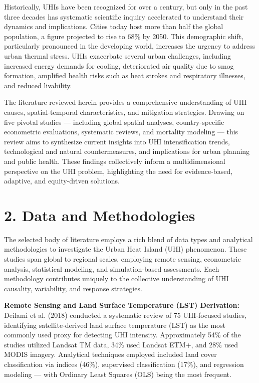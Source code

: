 \documentclass[draft]{agujournal}
\begin{document}
Historically, UHIs have been recognized for over a century, but only in the past three decades has systematic scientific inquiry accelerated to understand their dynamics and implications. Cities today host more than half the global population, a figure projected to rise to 68\% by 2050. This demographic shift, particularly pronounced in the developing world, increases the urgency to address urban thermal stress. UHIs exacerbate several urban challenges, including increased energy demands for cooling, deteriorated air quality due to smog formation, amplified health risks such as heat strokes and respiratory illnesses, and reduced livability.

The literature reviewed herein provides a comprehensive understanding of UHI causes, spatial-temporal characteristics, and mitigation strategies. Drawing on five pivotal studies — including global spatial analyses, country-specific econometric evaluations, systematic reviews, and mortality modeling — this review aims to synthesize current insights into UHI intensification trends, technological and natural countermeasures, and implications for urban planning and public health. These findings collectively inform a multidimensional perspective on the UHI problem, highlighting the need for evidence-based, adaptive, and equity-driven solutions.

\section*{2. Data and Methodologies}

The selected body of literature employs a rich blend of data types and analytical methodologies to investigate the Urban Heat Island (UHI) phenomenon. These studies span global to regional scales, employing remote sensing, econometric analysis, statistical modeling, and simulation-based assessments. Each methodology contributes uniquely to the collective understanding of UHI causality, variability, and response strategies.

\textbf{Remote Sensing and Land Surface Temperature (LST) Derivation:} Deilami et al. (2018) conducted a systematic review of 75 UHI-focused studies, identifying satellite-derived land surface temperature (LST) as the most commonly used proxy for detecting UHI intensity. Approximately 54\% of the studies utilized Landsat TM data, 34\% used Landsat ETM+, and 28\% used MODIS imagery. Analytical techniques employed included land cover classification via indices (46\%), supervised classification (17\%), and regression modeling — with Ordinary Least Squares (OLS) being the most frequent.
\end{document}
